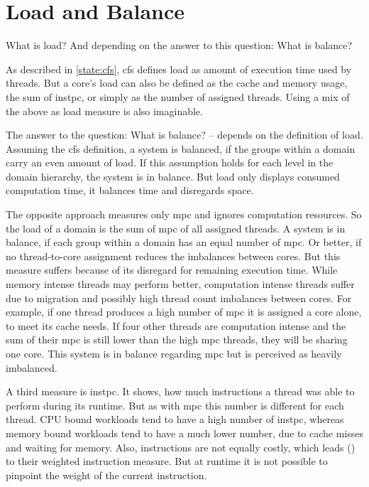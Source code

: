 \section{Load and Balance}
\label{design:load}


What is load?
And depending on the answer to this question: What is balance?

As described in \ref{state:cfs}, \gls{cfs} defines load as amount of
execution time used by threads.
But a core's load can also be defined as
the cache and memory usage, the sum of \gls{instpc}, or simply as the number of
assigned threads.
Using a mix of the above as load measure is also imaginable.

The answer to the question: What is balance? -- depends on the definition of
load.
Assuming the \gls{cfs} definition, a system is balanced, if the groups within a
domain carry an even amount of load.
If this assumption holds for each level in the domain hierarchy, the system is
in balance.
But load only displays consumed computation time, it balances time and
disregards space.

The opposite approach measures only \gls{mpc} and ignores computation
resources.
So the load of a domain is the sum of \gls{mpc} of all assigned threads.
A system is in balance, if each group within a domain has an equal number of
\gls{mpc}.
Or better, if no thread-to-core assignment reduces the imbalances between cores.
But this measure suffers because of its disregard for remaining execution time.
While memory intense threads may perform better, computation intense threads
suffer due to migration and possibly high thread count imbalances between
cores.
For example, if one thread produces a high number of \gls{mpc} it is assigned a
core alone, to meet its cache needs.
If four other threads are computation intense and the sum of their \gls{mpc} is
still lower than the high \gls{mpc} threads, they will be sharing one core.
This system is in balance regarding \gls{mpc} but is perceived as heavily
imbalanced.

A third measure is \gls{instpc}.
It shows, how much instructions a thread was able to perform during its
runtime.
But as with \gls{mpc} this number is different for each thread.
CPU bound workloads tend to have a high number of \gls{instpc},
whereas memory bound workloads tend to have a much lower number, due to cache
misses and waiting for memory.
Also, instructions are not equally costly, which leads
\citeauthor{snavely_symbiotic_2000} (\cite{snavely_symbiotic_2000}) to their
weighted instruction measure.
But at runtime it is not possible to pinpoint the weight of the current
instruction.

